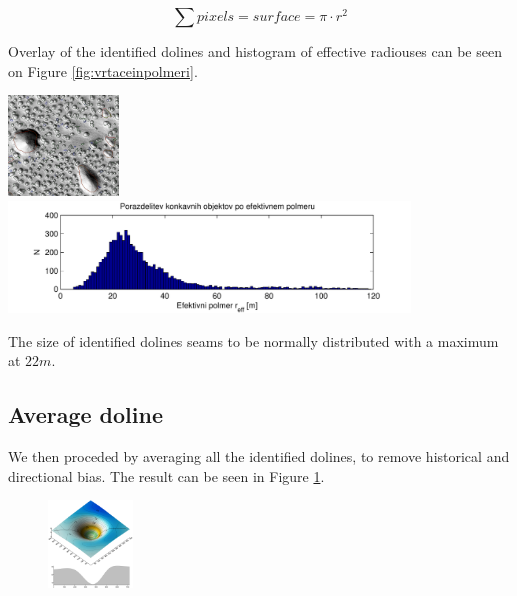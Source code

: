 \documentclass[a0,portrait]{a0poster}
\begin{document}
\begin{multicols}{2}
\begin{equation}
	\sum pixels = surface = \pi \cdot r^2
	\label{eq:reff}
\end{equation}

Overlay of the identified dolines and histogram of effective radiouses can be seen on Figure \ref{fig:vrtaceinpolmeri}.

\begin{minipage}[b]{0.5\textwidth}
	\includegraphics[width=0.22\textwidth]{menisija-vrtace}
	\includegraphics[width=0.8\textwidth]{menisija-polmeri-hist}
	\label{fig:vrtaceinpolmeri}
\end{minipage}

The size of identified dolines seams to be normally distributed with a maximum at $22m$.


\subsection*{Average doline}

We then proceded by averaging all the identified dolines, to remove historical and directional bias. The result can be seen in Figure \ref{fig:vrtaca}.

\begin{figure}
\begin{center}
	\includegraphics[width=0.2\textwidth]{menisija-vrtaca.png}
	\label{fig:vrtaca}
\end{center}
\end{figure}


\end{multicols}
\end{document}
